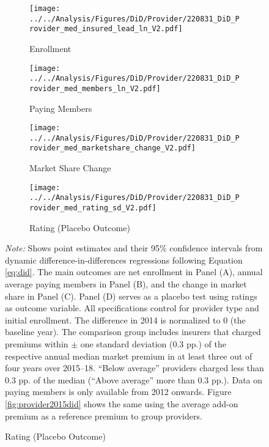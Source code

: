 \documentclass[a4paper, 11pt, english]{article}
\begin{document}
\begin{figure}[htpb]
	\captionsetup{justification=centering}
	\caption{Difference-in-Differences Analyses of Health Insurance Demand on the Insurer-Level \\ (Reference: Median Add-On Premium)}
	\label{fig:provider2015did_med}
	\begin{subfigure}[b]{0.49\textwidth}
		\caption{Enrollment}
		\label{fig:provider2015did_demand_med}
		\texttt{[image: ../../Analysis/Figures/DiD/Provider/220831\_DiD\_Provider\_med\_insured\_lead\_ln\_V2.pdf]}
	\end{subfigure}
	\begin{subfigure}[b]{0.49\textwidth}
		\caption{Paying Members}
		\label{fig:provider2015did_enrollmentchange_med}
		\texttt{[image: ../../Analysis/Figures/DiD/Provider/220831\_DiD\_Provider\_med\_members\_ln\_V2.pdf]}
	\end{subfigure}
	\begin{subfigure}[b]{0.49\textwidth}
		\caption{Market Share Change}
		\label{fig:provider2015did_marketsharechange_med}
		\texttt{[image: ../../Analysis/Figures/DiD/Provider/220831\_DiD\_Provider\_med\_marketshare\_change\_V2.pdf]}
	\end{subfigure}
	\begin{subfigure}[b]{0.49\textwidth}
		\caption{Rating (Placebo Outcome)}
		\label{fig:provider2015did_rating_med}
		\texttt{[image: ../../Analysis/Figures/DiD/Provider/220831\_DiD\_Provider\_med\_rating\_sd\_V2.pdf]}
	\end{subfigure}
	\begin{minipage}{\textwidth}
		\footnotesize \vspace{0.2em}
		\textit{Note:} Shows point estimates and their 95\% confidence intervals from dynamic difference-in-differences regressions following Equation \eqref{eq:did}. 
		The main outcomes are net enrollment in Panel (A), annual average paying members in Panel (B), and the change in market share in Panel (C). Panel (D) serves as a placebo test using ratings as outcome variable.
		All specifications control for provider type and initial enrollment. The difference in 2014 is normalized to 0 (the baseline year).
		The comparison group includes insurers that charged premiums within  $\pm$ one standard deviation (0.3 pp.) of the respective annual median market premium in at least three out of four years over 2015--18. ``Below average'' providers charged less than 0.3 pp. of the median (``Above average'' more than 0.3 pp.). 
		Data on paying members is only available from 2012 onwards.
		Figure \ref{fig:provider2015did} shows the same using the average add-on premium as a reference premium to group providers.
	\end{minipage}
\end{figure}
\end{document}
